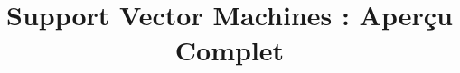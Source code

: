 \documentclass{beamer}
\title{Support Vector Machines : Aperçu Complet}
\author{}
\date{}
\begin{document}
\frame{\titlepage}
\end{document}
